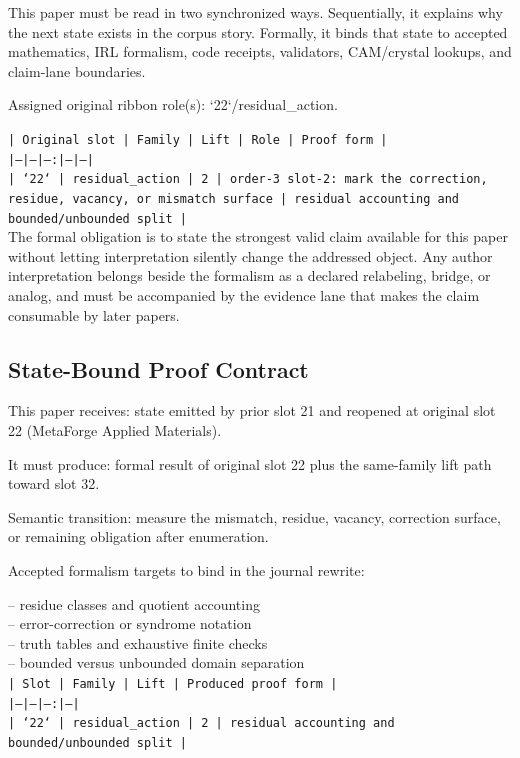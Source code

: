\documentclass[11pt]{article}
\begin{document}
This paper must be read in two synchronized ways. Sequentially, it explains why
the next state exists in the corpus story. Formally, it binds that state to
accepted mathematics, IRL formalism, code receipts, validators, CAM/crystal
lookups, and claim-lane boundaries.

Assigned original ribbon role(s): `22`/residual\_action.

\noindent\texttt{| Original slot | Family | Lift | Role | Proof form |}\\
\noindent\texttt{|---|---|---:|---|---|}\\
\noindent\texttt{| `22` | residual\_action | 2 | order-3 slot-2: mark the correction, residue, vacancy, or mismatch surface | residual accounting and bounded/unbounded split |}\\

The formal obligation is to state the strongest valid claim available for this
paper without letting interpretation silently change the addressed object. Any
author interpretation belongs beside the formalism as a declared relabeling,
bridge, or analog, and must be accompanied by the evidence lane that makes the
claim consumable by later papers.

\subsection*{State-Bound Proof Contract}

This paper receives: state emitted by prior slot 21 and reopened at original slot 22 (MetaForge Applied Materials).

It must produce: formal result of original slot 22 plus the same-family lift path toward slot 32.

Semantic transition: measure the mismatch, residue, vacancy, correction surface, or remaining obligation after enumeration.

Accepted formalism targets to bind in the journal rewrite:

\noindent{}-- residue classes and quotient accounting\\
\noindent{}-- error-correction or syndrome notation\\
\noindent{}-- truth tables and exhaustive finite checks\\
\noindent{}-- bounded versus unbounded domain separation\\

\noindent\texttt{| Slot | Family | Lift | Produced proof form |}\\
\noindent\texttt{|---|---|---:|---|}\\
\noindent\texttt{| `22` | residual\_action | 2 | residual accounting and bounded/unbounded split |}\\
\end{document}
